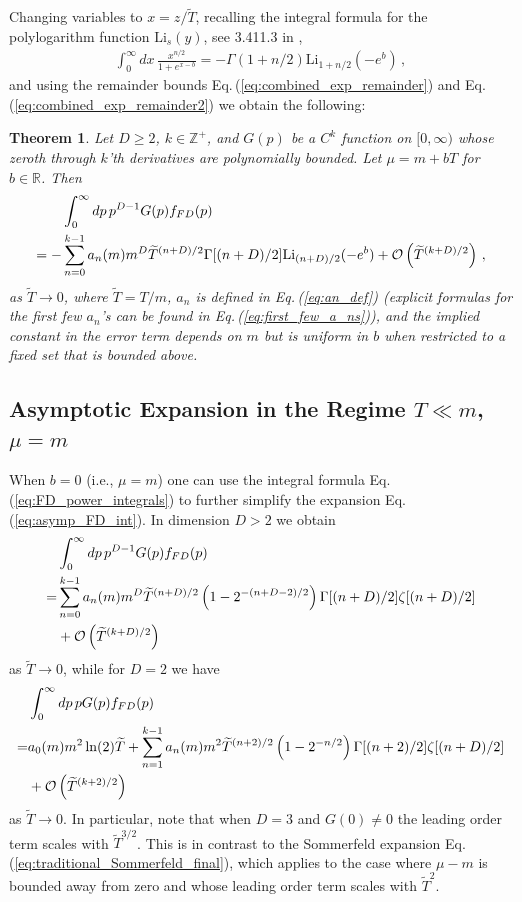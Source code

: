 \documentclass[sn-mathphys,Numbered]{sn-jnl}
\newcommand{\req}[1]{Eq.\,(\ref{#1})}
\newtheorem{theorem}{Theorem}
\begin{document}
Changing variables to $x=z/\widetilde{T}$, recalling the integral formula for the polylogarithm function $\mathrm{Li}_s(y)$, see 3.411.3 in \cite{Gradshteyn:1943cpj},
\begin{align}\label{eq:h_decomp_eval}
 \int_0^\infty dx \, \frac{x^{n/2}}{1+e^{x-b}} =-\Gamma(1+n/2)\mathrm{Li}_{1+n/2}(-e^b)\,,
\end{align}
and using the remainder bounds \req{eq:combined_exp_remainder} and \req{eq:combined_exp_remainder2} we obtain the following:
\begin{theorem}\label{thm:asymp_FD_int_Delta_mu_small}
Let $D\geq 2$, $k\in\mathbb{Z}^+$, and $G(p)$ be a $C^k$ function on $[0,\infty)$ whose zeroth through $k$'th derivatives are polynomially bounded. Let $\mu=m+bT$ for $b\in\mathbb{R}$. Then
\begin{align}\label{eq:asymp_FD_int}
&\int_0^\infty dp\, p^{D-1} G(p) f_{FD}(p)\notag\\
 =-&\sum_{n=0}^{k-1} a_n(m)m^{D}\widetilde{T}^{(n+D)/2}\Gamma[(n+D)/2]\mathrm{Li}_{(n+D)/2}(-e^b)+\mathcal{O}\left(\widetilde{T}^{(k+D)/2}\right)\,,
\end{align}
as $\widetilde{T}\to 0$, where $\widetilde{T}=T/m$, $a_n$ is defined in \req{eq:an_def} (explicit formulas for the first few $a_n$'s can be found in \req{eq:first_few_a_ns}), and the implied constant in the error term depends on $m$ but is uniform in $b$ when restricted to a fixed set that is bounded above. 
\end{theorem}

\subsection{Asymptotic Expansion in the Regime $T\ll m$, $\mu=m$}\label{sec:b_0}
When $b=0$ (i.e., $\mu=m$) one can use the integral formula \req{eq:FD_power_integrals} to further simplify the expansion \req{eq:asymp_FD_int}. In dimension $D>2$ we obtain
\begin{align}\label{eq:asymp_FD_int_b_0}
&\int_0^\infty dp\, p^{D-1} G(p) f_{FD}(p)\\
 =&\sum_{n=0}^{k-1} a_n(m)m^{D}\widetilde{T}^{(n+D)/2}\left(1-2^{-(n+D-2)/2}\right)\Gamma[(n+D)/2]\zeta[(n+D)/2]\notag\\
 &+\mathcal{O}\left(\widetilde{T}^{(k+D)/2}\right)\notag
\end{align}
as $\widetilde{T}\to 0$, while for $D=2$ we have
\begin{align}\label{eq:asymp_FD_int_b_D2}
&\int_0^\infty dp\, p G(p) f_{FD}(p)\\
 =& a_0(m)m^2 \ln(2)\widetilde{T}+ 
 \sum_{n=1}^{k-1} a_n(m)m^{2}\widetilde{T}^{(n+2)/2}\left(1-2^{-n/2}\right)\Gamma[(n+2)/2]\zeta[(n+D)/2]\notag\\
 &+\mathcal{O}\left(\widetilde{T}^{(k+2)/2}\right)\notag
\end{align}
as $\widetilde{T}\to 0$. In particular, note that when $D=3$ and $G(0)\neq 0$ the leading order term scales with $\widetilde{T}^{3/2}$. This is in contrast to the Sommerfeld expansion \req{eq:traditional_Sommerfeld_final}, which applies to the case where $\mu-m$ is bounded away from zero and whose leading order term scales with $\widetilde{T}^2$.
\end{document}
